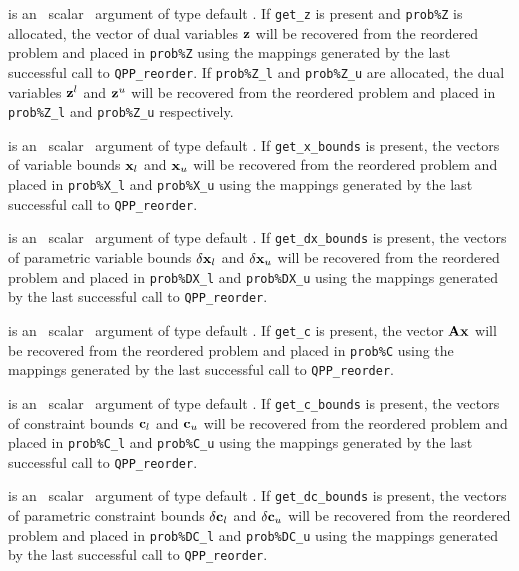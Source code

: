 \documentclass{galahad}
\newcommand{\packagename}{QPP}
\begin{document}
\begin{description}
is an \optional\ scalar \intentin\ argument of type default \logical. 
If {\tt get\_z} is present and {\tt prob\%Z} is allocated, 
the vector of dual variables ${\mathbf{z}}$
will be recovered from  the reordered problem and placed in {\tt prob\%Z} 
using the mappings generated by the last successful call to 
{\tt \packagename\_reorder}. If {\tt prob\%Z\_l} and {\tt prob\%Z\_u} 
are allocated, the dual variables
${\mathbf{z}}^l$ and ${\mathbf{z}}^u$ will be recovered from  the reordered problem and 
placed in {\tt prob\%Z\_l} and {\tt prob\%Z\_u} respectively.
 
is an \optional\ scalar \intentin\ argument of type default \logical. 
If {\tt get\_x\_bounds} is present, 
the vectors of variable bounds ${\mathbf{x}}_l$ and ${\mathbf{x}}_u$
will be recovered from  the reordered problem and placed in {\tt prob\%X\_l} 
and {\tt prob\%X\_u} using the mappings generated by the last successful 
call to {\tt \packagename\_reorder}. 
 
is an \optional\ scalar \intentin\ argument of type default \logical. 
If {\tt get\_dx\_bounds} is present, 
the vectors of parametric variable bounds $\delta {\mathbf{x}}_l$ and 
$\delta {\mathbf{x}}_u$
will be recovered from  the reordered problem and placed in {\tt prob\%DX\_l} 
and {\tt prob\%DX\_u} using the mappings generated by the last successful 
call to {\tt \packagename\_reorder}. 

is an \optional\ scalar \intentin\ argument of type default \logical. 
If {\tt get\_c} is present, the vector ${\mathbf{A}} {\mathbf{x}}$ 
will be recovered from  the reordered problem and placed in {\tt prob\%C} 
using the mappings generated by the last successful call to 
{\tt \packagename\_reorder}. 
 
is an \optional\ scalar \intentin\ argument of type default \logical. 
If {\tt get\_c\_bounds} is present, 
the vectors of constraint bounds ${\mathbf{c}}_l$ and 
${\mathbf{c}}_u$
will be recovered from  the reordered problem and placed in {\tt prob\%C\_l} 
and {\tt prob\%C\_u} using the mappings generated by the last successful 
call to {\tt \packagename\_reorder}. 
 
is an \optional\ scalar \intentin\ argument of type default \logical. 
If {\tt get\_dc\_bounds} is present, 
the vectors of parametric constraint bounds $\delta {\mathbf{c}}_l$ and $\delta {\mathbf{c}}_u$
will be recovered from  the reordered problem and placed in {\tt prob\%DC\_l} 
and {\tt prob\%DC\_u} using the mappings generated by the last successful 
call to {\tt \packagename\_reorder}. 
 

\end{description}
\end{document}
